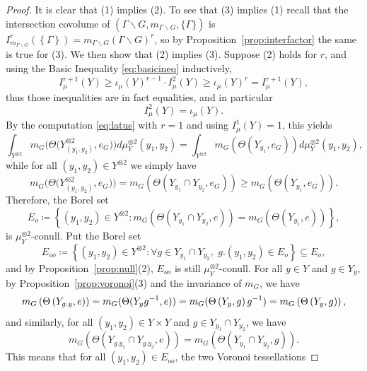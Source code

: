 \documentclass{amsart}
\numberwithin{equation}{subsection}
\theoremstyle{remark}
\begin{document}
\begin{proof}
It is clear that (1) implies (2). To see that (3) implies (1) recall that the intersection covolume of \(\left(\Gamma\backslash G,m_{\Gamma\backslash G},\{\Gamma\}\right)\) is \(I_{m_{\Gamma\backslash G}}^{r}\left(\left\{\Gamma\right\} \right)=m_{\Gamma\backslash G}\left(\Gamma\backslash G\right)^{r}\), so by Proposition~\ref{prop:interfactor} the same is true for (3). We then show that (2) implies (3). Suppose (2) holds for \(r\), and using the Basic Inequality \eqref{eq:basicineq} inductively,
\[I_{\mu}^{r+1}\left(Y\right)\geq\iota_{\mu}\left(Y\right)^{r-1}\cdot I_{\mu}^{2}\left(Y\right)\geq\iota_{\mu}\left(Y\right)^{r}=I_{\mu}^{r+1}\left(Y\right),\]
thus those inequalities are in fact equalities, and in particular
\[I_{\mu}^{2}\left(Y\right)=\iota_{\mu}\left(Y\right).\]
By the computation \eqref{eq:latus} with \(r=1\) and using \(I_{\mu}^{1}\left(Y\right)=1\), this yields
\[\int_{Y^{\otimes2}}m_{G}\big(\Theta\big(Y_{\left(y_{1},y_{2}\right)}^{\otimes2},e_{G}\big)\big)d\mu_{Y}^{\otimes2}\left(y_{1},y_{2}\right)=\int_{Y^{\otimes2}}m_{G}\left(\Theta\left(Y_{y_{1}},e_{G}\right)\right)d\mu_{Y}^{\otimes2}\left(y_{1},y_{2}\right),\]
while for all \(\left(y_{1},y_{2}\right)\in Y^{\otimes 2}\) we simply have
\[m_{G}\big(\Theta\big(Y_{\left(y_{1},y_{2}\right)}^{\otimes2},e_{G}\big)\big)=m_{G}\left(\Theta\left(Y_{y_{1}}\cap Y_{y_{2}},e_{G}\right)\right)\geq m_{G}\left(\Theta\left(Y_{y_{1}},e_{G}\right)\right).\]
Therefore, the Borel set
\[E_{o}\coloneqq \left\{\left(y_{1},y_{2}\right)\in Y^{\otimes 2}: m_{G}\left(\Theta\left(Y_{y_{1}}\cap Y_{y_{2}},e\right)\right)=m_{G}\left(\Theta\left(Y_{y_{1}},e\right)\right)\right\},\]
is \(\mu_{Y}^{\otimes 2}\)-conull. Put the Borel set
\[E_{oo}\coloneqq \left\{\left(y_{1},y_{2}\right)\in Y^{\otimes 2}:\forall g\in Y_{y_{1}}\cap Y_{y_{2}},\,\,g.\left(y_{1},y_{2}\right)\in E_{o}\right\}\subseteq E_{o},\]
and by Proposition~\ref{prop:null}(2), \(E_{oo}\) is still \(\mu_{Y}^{\otimes 2}\)-conull. For all \(y\in Y\) and \(g\in Y_{y}\), by Proposition~\ref{prop:voronoi}(3) and the invariance of \(m_{G}\), we have
\[m_{G}\left(\Theta\left(Y_{g.y},e\right)\right)=m_{G}\small(\Theta\small(Y_{y}g^{-1},e\small)\small)=m_{G}\small(\Theta\left(Y_{y},g\right)g^{-1}\small)=m_{G}\left(\Theta\left(Y_{y},g\right)\right),\]
and similarly, for all \(\left(y_{1},y_{2}\right)\in Y\times Y\) and \(g\in Y_{y_{1}}\cap Y_{y_{2}}\), we have
\[m_{G}\left(\Theta\left(Y_{g.y_{1}}\cap Y_{g.y_{2}},e\right)\right)=m_{G}\left(\Theta\left(Y_{y_{1}}\cap Y_{y_{2}},g\right)\right).\]
This means that for all \(\left(y_{1},y_{2}\right)\in E_{oo}\), the two Voronoi tessellations

\end{proof}
\end{document}
